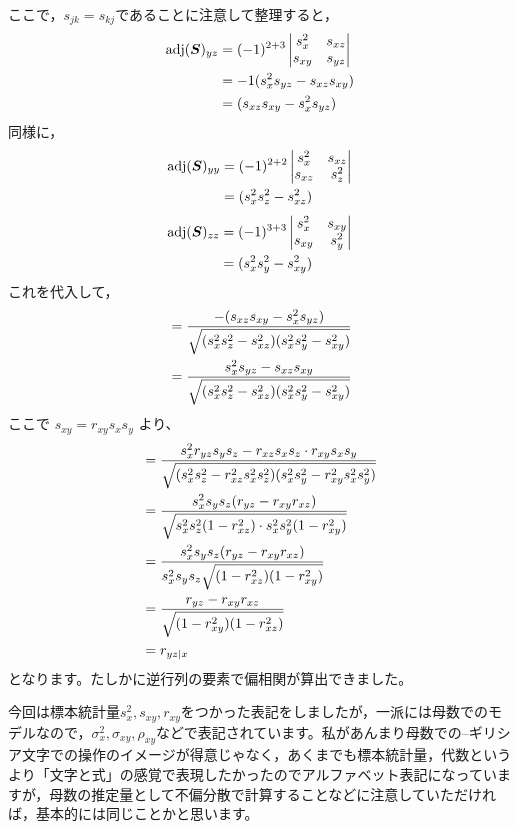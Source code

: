 \documentclass[dvipsnames]{ltjsarticle}
\begin{document}
ここで，$s_{jk}=s_{kj}$であることに注意して整理すると，
\begin{align}
\text{adj} (\bm{S})_{yz} & =
(-1)^{2+3}\begin{vmatrix} s_x^2 & s_{xz} \\ s_{xy} & s_{yz} \end{vmatrix} \notag\\
& = -1 (s_x^2 s_{yz} - s_{xz}s_{xy}) \notag\\
& = (s_{xz}s_{xy} - s_x^2 s_{yz})
\end{align}
同様に，
\begin{align}
    \text{adj} (\bm{S})_{yy} & =
    (-1)^{2+2}\begin{vmatrix} s_x^2 & s_{xz} \\ s_{xz} & s_{z}^2 \end{vmatrix} \notag\\
    & = (s_x^2 s_z^2 - s_{xz}^2)
\end{align}
\begin{align}
    \text{adj} (\bm{S})_{zz} & = (-1)^{3+3}\begin{vmatrix} s_x^2 & s_{xy} \\ s_{xy} & s_y^2 \end{vmatrix} \notag\\
    & = (s_x^2 s_y^2 - s_{xy}^2)
\end{align}
これを代入して，
\begin{align}
& = \frac{-(s_{xz} s_{xy} - s_x^2 s_{yz})}{\sqrt{(s_x^2 s_z^2 - s_{xz}^2) (s_x^2 s_y^2 - s_{xy}^2)}} \notag \\
& = \frac{s_x^2 s_{yz} - s_{xz} s_{xy}}{\sqrt{(s_x^2 s_z^2 - s_{xz}^2) (s_x^2 s_y^2 - s_{xy}^2)}}
\end{align}
ここで $s_{xy} = r_{xy}s_xs_y$ より、
\begin{align}
&= \frac{s_x^2 r_{yz} s_y s_z - r_{xz} s_x s_z \cdot r_{xy} s_x s_y}{\sqrt{(s_x^2 s_z^2 - r_{xz}^2 s_x^2 s_z^2) (s_x^2 s_y^2 - r_{xy}^2 s_x^2 s_y^2)}}\notag \\
&= \frac{s_x^2 s_y s_z (r_{yz} - r_{xy} r_{xz})}{\sqrt{s_x^2 s_z^2 (1 - r_{xz}^2) \cdot s_x^2 s_y^2 (1 - r_{xy}^2)}} \notag \\
&= \frac{s_x^2 s_y s_z (r_{yz} - r_{xy} r_{xz})}{s_x^2 s_y s_z \sqrt{(1 - r_{xz}^2)(1 - r_{xy}^2)}} \notag \\
&= \frac{r_{yz} - r_{xy} r_{xz}}{\sqrt{(1 - r_{xy}^2) (1 - r_{xz}^2)}} \notag\\
& = r_{yz|x}
\end{align}
となります。たしかに逆行列の要素で偏相関が算出できました。

今回は標本統計量$s_x^2,s_{xy},r_{xy}$をつかった表記をしましたが，一派には母数でのモデルなので，$\sigma_{x}^2,\sigma_{xy},\rho_{xy}$などで表記されています。私があんまり母数での--ギリシア文字での操作のイメージが得意じゃなく，あくまでも標本統計量，代数というより「文字と式」の感覚で表現したかったのでアルファベット表記になっていますが，母数の推定量として不偏分散で計算することなどに注意していただければ，基本的には同じことかと思います。
\end{document}
